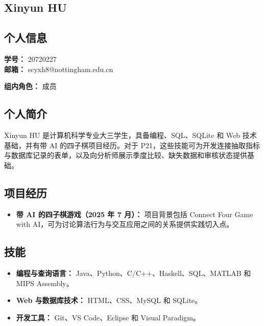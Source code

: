 \documentclass[a4paper,12pt]{article}
\newcommand{\PersonalInformation}[2]{%
  \subsection*{个人信息}
  \if\relax\detokenize{#1}\relax\else
  \noindent\textbf{学号：} #1\\
  \fi
  \textbf{邮箱：} #2\par
}
\begin{document}
\subsection{Xinyun HU}
\PersonalInformation{20720227}{scyxh8@nottingham.edu.cn}
\noindent\textbf{组内角色：} 成员\par

\subsection*{个人简介}
Xinyun HU 是计算机科学专业大三学生，具备编程、SQL、SQLite 和 Web 技术基础，并有带 AI 的四子棋项目经历。对于 P21，这些技能可为开发连接抽取指标与数据库记录的表单，以及向分析师展示季度比较、缺失数据和审核状态提供基础。

\subsection*{项目经历}
\begin{itemize}
  \item \textbf{带 AI 的四子棋游戏（2025 年 7 月）：} 项目背景包括 Connect Four Game with AI，可为讨论算法行为与交互应用之间的关系提供实践切入点。
\end{itemize}

\subsection*{技能}
\begin{itemize}
  \item \textbf{编程与查询语言：} Java、Python、C/C++、Haskell、SQL、MATLAB 和 MIPS Assembly。
  \item \textbf{Web 与数据库技术：} HTML、CSS、MySQL 和 SQLite。
  \item \textbf{开发工具：} Git、VS Code、Eclipse 和 Visual Paradigm。
\end{itemize}
\end{document}
